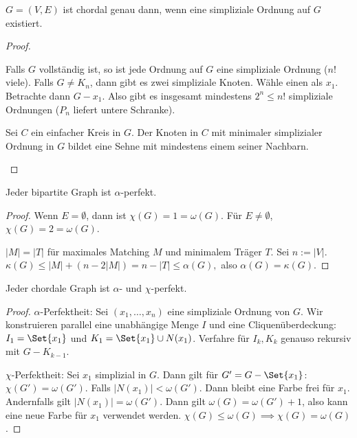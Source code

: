 \begin{st}
    $G = (V, E)$ ist chordal genau dann, wenn eine simpliziale Ordnung auf $G$ existiert.
    \begin{proof}
        \begin{seg}{\ProofImplication}
            Falls $G$ vollständig ist, so ist jede Ordnung auf $G$ eine simpliziale Ordnung ($n!$ viele).
            Falls $G \neq K_n$, dann gibt es zwei simpliziale Knoten.
            Wähle einen als $x_1$.
            Betrachte dann $G - x_1$.
            Also gibt es insgesamt mindestens $2^n \le n!$ simpliziale Ordnungen ($P_n$ liefert untere Schranke).
        \end{seg}
        \begin{seg}{\ProofImplication*}
            Sei $C$ ein einfacher Kreis in $G$.
            Der Knoten in $C$ mit minimaler simplizialer Ordnung in $G$ bildet eine Sehne mit mindestens einem seiner Nachbarn.
        \end{seg}
    \end{proof}
\end{st}

\begin{st}
    Jeder bipartite Graph ist $\alpha$-perfekt.
    \begin{proof}
        Wenn $E = \emptyset$, dann ist $\chi(G) = 1 = \omega(G)$.
        Für $E \neq \emptyset$, $\chi(G) = 2 = \omega(G)$.

        $|M| = |T|$ für maximales Matching $M$ und minimalem Träger $T$.
        Sei $n := |V|$.
        \begin{math}
            \kappa(G) \le |M| + (n - 2 |M|)
            = n - |T|
            \le \alpha(G),
        \end{math}
        also $\alpha(G) = \kappa(G)$.
    \end{proof}
\end{st}

\begin{st}
    Jeder chordale Graph ist $\alpha$- und $\chi$-perfekt.
    \begin{proof}
        $\alpha$-Perfektheit:
        Sei $(x_1, \dotsc, x_n)$ eine simpliziale Ordnung von $G$.
        Wir konstruieren parallel eine unabhängige Menge $I$ und eine Cliquenüberdeckung: $I_1 = \Set{x_1}$ und $K_1 = \Set{x_1} \cup N(x_1)$.
        Verfahre für $I_k, K_k$ genauso rekursiv mit $G - K_{k-1}$.

        $\chi$-Perfektheit:
        Sei $x_1$ simplizial in $G$.
        Dann gilt für $G' = G - \Set{x_1}$: $\chi(G') = \omega(G')$.
        Falls $|N(x_1)| < \omega(G')$.
        Dann bleibt eine Farbe frei für $x_1$.
        Andernfalls gilt $|N(x_1)| = \omega(G')$.
        Dann gilt $\omega(G) = \omega(G') + 1$, also kann eine neue Farbe für $x_1$ verwendet werden.
        $\chi(G) \le \omega(G) \implies \chi(G) = \omega(G)$.
    \end{proof}
\end{st}


